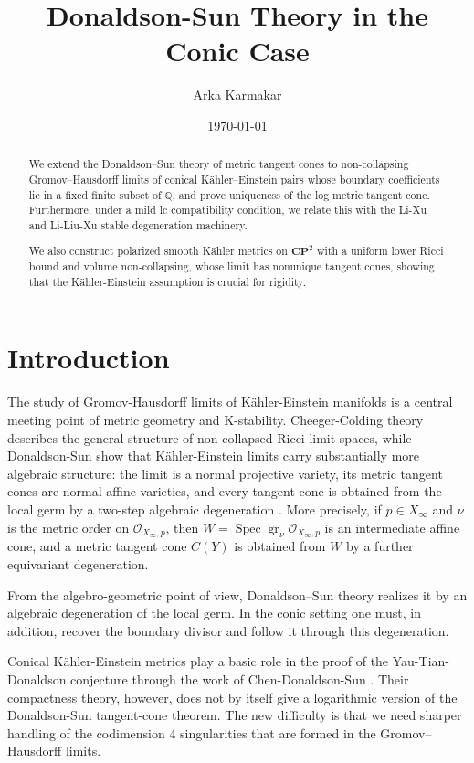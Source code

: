 \documentclass[11pt]{amsart}
\title{Donaldson-Sun Theory in the Conic Case}
\author{Arka Karmakar}
\date{\today}
\theoremstyle{definition}
\theoremstyle{remark}
\begin{document}
\maketitle

\begin{abstract}

We extend the Donaldson--Sun theory of metric tangent cones to non-collapsing
Gromov--Hausdorff limits of conical K\"ahler--Einstein pairs whose boundary
coefficients lie in a fixed finite subset of $\mathbb Q$, and prove uniqueness of the log metric tangent cone. Furthermore, under a mild lc compatibility condition, we relate this with the Li-Xu and Li-Liu-Xu stable degeneration machinery. 

We also construct polarized smooth Kähler metrics on $\mathbf{CP}^2$ with a uniform lower Ricci bound and volume non-collapsing, whose limit has nonunique tangent cones, showing that the Kähler-Einstein assumption is crucial for rigidity. \end{abstract}

\section{Introduction}

The study of Gromov-Hausdorff limits of K\"ahler-Einstein manifolds is a
central meeting point of metric geometry and K-stability. Cheeger-Colding
theory describes the general structure of non-collapsed Ricci-limit spaces,
while Donaldson-Sun show that K\"ahler-Einstein limits carry substantially
more algebraic structure: the limit is a normal projective variety, its metric
tangent cones are normal affine varieties, and every tangent cone is obtained
from the local germ by a two-step algebraic degeneration
\cite{DSI,DSII}. More precisely, if $p\in X_\infty$ and $\nu$ is the metric
order on $\mathcal O_{X_\infty,p}$, then $ W=\operatorname{Spec}\operatorname{gr}_\nu \mathcal O_{X_\infty,p}$ is an intermediate affine cone, and a metric tangent cone $C(Y)$ is obtained
from $W$ by a further equivariant degeneration.

From the algebro-geometric point of view, Donaldson--Sun theory realizes it by
an algebraic degeneration of the local germ. In the conic setting one must, in
addition, recover the boundary divisor and follow it through this degeneration.

Conical K\"ahler-Einstein metrics play a basic role in the proof of the
Yau-Tian-Donaldson conjecture through the work of
Chen-Donaldson-Sun \cite{CDSI,CDSII,CDSIII}. Their compactness theory,
however, does not by itself give a logarithmic version of the
Donaldson-Sun tangent-cone theorem. The new difficulty is that we need sharper handling of the codimension $4$ singularities that are formed in the Gromov--Hausdorff limits. 
\end{document}
